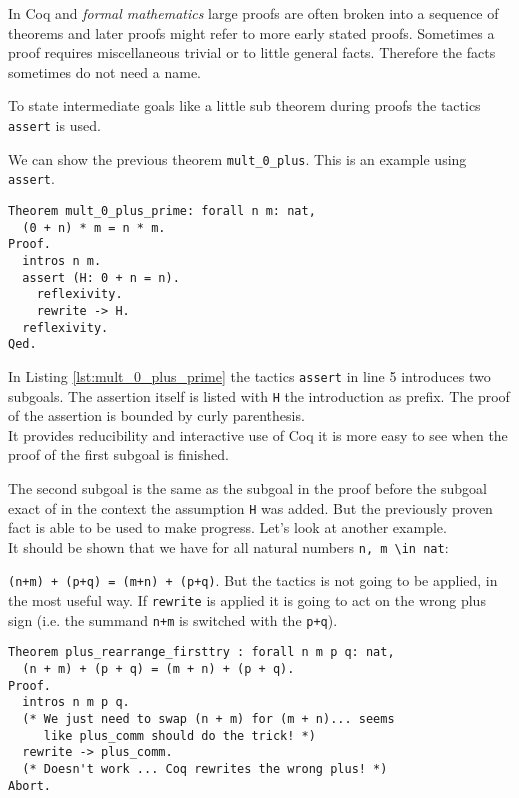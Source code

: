 In Coq and {\itshape formal mathematics} large proofs are often broken into a sequence of theorems and later proofs might refer to more early stated proofs.
Sometimes a proof requires miscellaneous trivial or to little general facts. 
Therefore the facts sometimes do not need a name.

To state intermediate goals like a little sub theorem during proofs the tactics \lstinline!assert! is used.


\begin{example}
We can show the previous theorem \lstinline!mult_0_plus!. 
This is an example using \lstinline!assert!. 

\begin{lstlisting}[caption = \lstinline!mult_0_plus'!, label = lst:mult_0_plus_prime]
Theorem mult_0_plus_prime: forall n m: nat,
  (0 + n) * m = n * m. 
Proof.
  intros n m.
  assert (H: 0 + n = n).  
  	reflexivity. 
  	rewrite -> H.
  reflexivity.  
Qed.
\end{lstlisting}
\end{example}

In Listing \ref{lst:mult_0_plus_prime} the tactics \lstinline!assert! in line 5 introduces two subgoals. 
The assertion itself is listed with \lstinline!H! the introduction as prefix.
The proof of the assertion is bounded by curly parenthesis.\\
It provides reducibility and interactive use of Coq it is more easy to see when the proof of the first subgoal is finished.

The second subgoal is the same as the subgoal in the proof before the subgoal exact of in the context the assumption \lstinline!H! was added.
But the previously proven fact is able to be used to make progress.
Let's look at another example.\\
 
It should be shown that we have for all natural numbers \lstinline!n, m \in nat!:
 
\lstinline!(n+m) + (p+q) = (m+n) + (p+q)!.
But the tactics is not going to be applied, in the most useful way. 
If \lstinline!rewrite! is applied it is going to act on the wrong plus sign (i.e. the summand \lstinline!n+m! is switched with the \lstinline!p+q!).
\begin{lstlisting}[caption = \lstinline!plus_rearrange_firstttry!, label=lst:plus_rearrange_firsttry]
Theorem plus_rearrange_firsttry : forall n m p q: nat,
  (n + m) + (p + q) = (m + n) + (p + q).
Proof.
  intros n m p q.
  (* We just need to swap (n + m) for (m + n)... seems
     like plus_comm should do the trick! *)
  rewrite -> plus_comm.
  (* Doesn't work ... Coq rewrites the wrong plus! *)
Abort.
\end{lstlisting}


